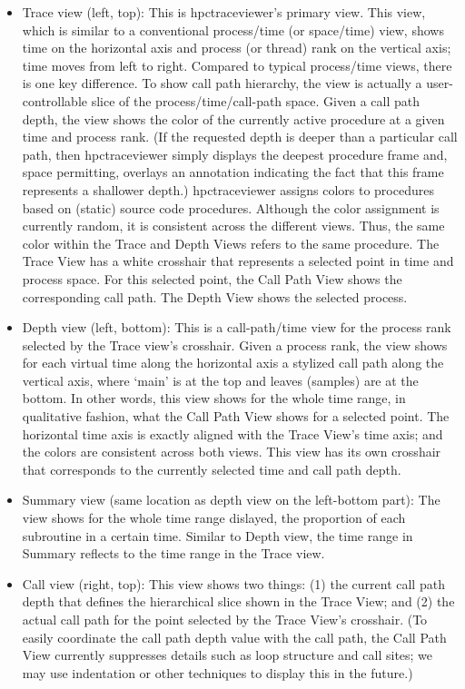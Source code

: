 \documentclass[english]{article}
\begin{document}
\begin{itemize}
\item Trace view (left, top):
  This is hpctraceviewer's primary view.
  This view, which is similar to a conventional process/time (or space/time) view, shows time on the horizontal axis and process (or thread) rank on the vertical axis; time moves from left to right.
  Compared to typical process/time views, there is one key difference.
  To show call path hierarchy, the view is actually a user-controllable slice of the process/time/call-path space.
  Given a call path depth, the view shows the color of the currently active procedure at a given time and process rank.
  (If the requested depth is deeper than a particular call path, then hpctraceviewer simply displays the deepest procedure frame and, space permitting, overlays an annotation indicating the fact that this frame represents a shallower depth.)
  hpctraceviewer assigns colors to procedures based on (static) source code procedures.
  Although the color assignment is currently random, it is consistent across the different views.
  Thus, the same color within the Trace and Depth Views refers to the same procedure.
  The Trace View has a white crosshair that represents a selected point in time and process space.
  For this selected point, the Call Path View shows the corresponding call path.
  The Depth View shows the selected process.

\item Depth view (left, bottom):
  This is a call-path/time view for the process rank selected by the Trace view's crosshair.
  Given a process rank, the view shows for each virtual time along the horizontal axis a stylized call path along the vertical axis, where `main' is at the top and leaves (samples) are at the bottom.
  In other words, this view shows for the whole time range, in qualitative fashion, what the Call Path View shows for a selected point.
  The horizontal time axis is exactly aligned with the Trace View's time axis; and the colors are consistent across both views.
  This view has its own crosshair that corresponds to the currently selected time and call path depth.

\item Summary view (same location as depth view on the left-bottom part):
  The view shows for the whole time range dislayed, the proportion of each subroutine in a certain time.
  Similar to Depth view, the time range in Summary reflects to the time range in the Trace view. 

\item Call view (right, top):
  This view shows two things: (1) the current call path depth that defines the hierarchical slice shown in the Trace View; and (2) the actual call path for the point selected by the Trace View's crosshair.
  (To easily coordinate the call path depth value with the call path, the Call Path View currently suppresses details such as loop structure and call sites; we may use indentation or other techniques to display this in the future.)


\end{itemize}
\end{document}
